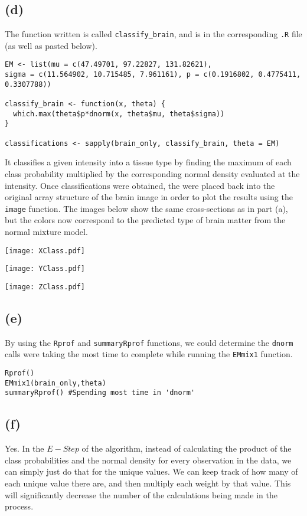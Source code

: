 \documentclass{article}
\begin{document}
\subsection*{(d)}
The function written is called {\tt classify\_brain}, and is in the corresponding {\tt .R} file (as well as pasted below).
\begin{verbatim}
EM <- list(mu = c(47.49701, 97.22827, 131.82621), 
sigma = c(11.564902, 10.715485, 7.961161), p = c(0.1916802, 0.4775411, 0.3307788))

classify_brain <- function(x, theta) {
  which.max(theta$p*dnorm(x, theta$mu, theta$sigma))
}

classifications <- sapply(brain_only, classify_brain, theta = EM)
\end{verbatim}
It classifies a given intensity into a tissue type by finding the maximum of each class probability multiplied by the corresponding normal density evaluated at the intensity. Once classifications were obtained, the were placed back into the original array structure of the brain image in order to plot the results using the {\tt image} function. The images below show the same cross-sections as in part (a), but the colors now correspond to the predicted type of brain matter from the normal mixture model.
 \begin{center}
\texttt{[image: XClass.pdf]}
\end{center}
\begin{center}
\texttt{[image: YClass.pdf]}
\end{center}
\begin{center}
\texttt{[image: ZClass.pdf]}
\end{center}


\subsection*{(e)}
By using the {\tt Rprof} and {\tt summaryRprof} functions, we could determine the {\tt dnorm} calls were taking the most time to complete while running the {\tt EMmix1} function.
\begin{verbatim}
Rprof()
EMmix1(brain_only,theta) 
summaryRprof() #Spending most time in 'dnorm'
\end{verbatim}

\subsection*{(f)}
Yes. In the $E-Step$ of the algorithm, instead of calculating the product of the class probabilities and the normal density for every observation in the data, we can simply just do that for the unique values. We can keep track of how many of each unique value there are, and then multiply each weight by that value. This will significantly decrease the number of the calculations being made in the process.
\end{document}
